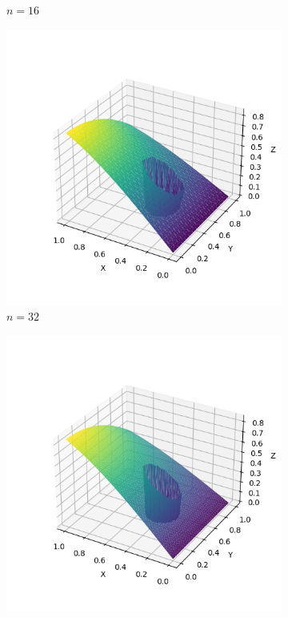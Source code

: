 \documentclass[lang=cn,a4paper,newtx,bibend=bibtex]{elegantpaper}
\begin{document}
\begin{figure}[H]
\begin{subfigure}[b]{0.18\textwidth}
      \caption{$n= 16$}
  \end{subfigure}
  \hfill
  \begin{subfigure}[b]{0.18\textwidth}
      \includegraphics[width=\textwidth]{../../res_bac/res-[data|2-mixed-irregular-c32].png}
      \caption{$n = 32$}
  \end{subfigure}
  \hfill
  \begin{subfigure}[b]{0.18\textwidth}
      \includegraphics[width=\textwidth]{../../res_bac/res-[data|2-mixed-irregular-d64].png}

\end{subfigure}
\end{figure}
\end{document}
